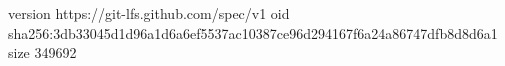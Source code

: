 version https://git-lfs.github.com/spec/v1
oid sha256:3db33045d1d96a1d6a6ef5537ac10387ce96d294167f6a24a86747dfb8d8d6a1
size 349692
